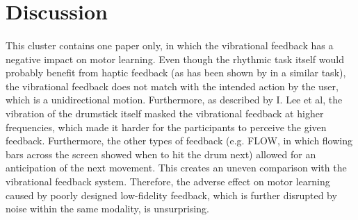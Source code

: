 
\section{Discussion}

\paragraph{}
This cluster contains one paper only, in which the vibrational feedback has a negative impact on motor learning. Even though the rhythmic task itself would probably benefit from haptic feedback (as has been shown by \cite{Graham2008} in a similar task), the vibrational feedback does not match with the intended action by the user, which is a unidirectional motion. Furthermore, as described by I. Lee et al, the vibration of the drumstick itself masked the vibrational feedback at higher frequencies, which made it harder for the participants to perceive the given feedback. Furthermore, the other types of feedback (e.g. FLOW, in which flowing bars across the screen showed when to hit the drum next) allowed for an anticipation of the next movement. This creates an uneven comparison with the vibrational feedback system. Therefore, the adverse effect on motor learning caused by poorly designed low-fidelity feedback, which is further disrupted by noise within the same modality, is unsurprising.

